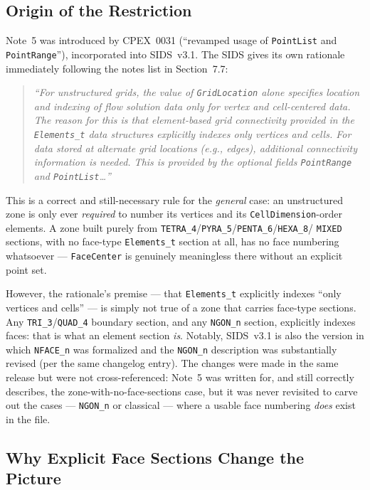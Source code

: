 \documentclass[11pt,letterpaper]{article}
\begin{document}
\subsection{Origin of the Restriction}

Note~5 was introduced by CPEX~0031 (``revamped usage of \texttt{PointList}
and \texttt{PointRange}''), incorporated into SIDS~v3.1. The SIDS gives
its own rationale immediately following the notes list in
Section~7.7:

\begin{quote}\small\itshape
``For unstructured grids, the value of \texttt{GridLocation} alone
specifies location and indexing of flow solution data only for vertex
and cell-centered data. The reason for this is that element-based grid
connectivity provided in the \texttt{Elements\_t} data structures
explicitly indexes only vertices and cells. For data stored at alternate
grid locations (e.g., edges), additional connectivity information is
needed. This is provided by the optional fields \texttt{PointRange} and
\texttt{PointList}\ldots''
\end{quote}

This is a correct and still-necessary rule for the \emph{general} case:
an unstructured zone is only ever \emph{required} to number its vertices
and its \texttt{CellDimension}-order elements. A zone built purely from
\texttt{TETRA\_4}/\texttt{PYRA\_5}/\texttt{PENTA\_6}/\texttt{HEXA\_8}/
\texttt{MIXED} sections, with no face-type \texttt{Elements\_t} section
at all, has no face numbering whatsoever --- \texttt{FaceCenter} is
genuinely meaningless there without an explicit point set.

However, the rationale's premise --- that \texttt{Elements\_t} explicitly
indexes ``only vertices and cells'' --- is simply not true of a zone that
carries face-type sections. Any \texttt{TRI\_3}/\texttt{QUAD\_4} boundary
section, and any \texttt{NGON\_n} section, explicitly indexes faces: that
is what an element section \emph{is}. Notably, SIDS~v3.1 is also the
version in which \texttt{NFACE\_n} was formalized and the \texttt{NGON\_n}
description was substantially revised (per the same changelog entry). The
changes were made in the same release but were not cross-referenced:
Note~5 was written for, and still correctly describes, the
zone-with-no-face-sections case, but it was never revisited to carve out
the cases --- \texttt{NGON\_n} or classical --- where a usable face
numbering \emph{does} exist in the file.

\subsection{Why Explicit Face Sections Change the Picture}
\label{sec:why-ngon}
\end{document}
